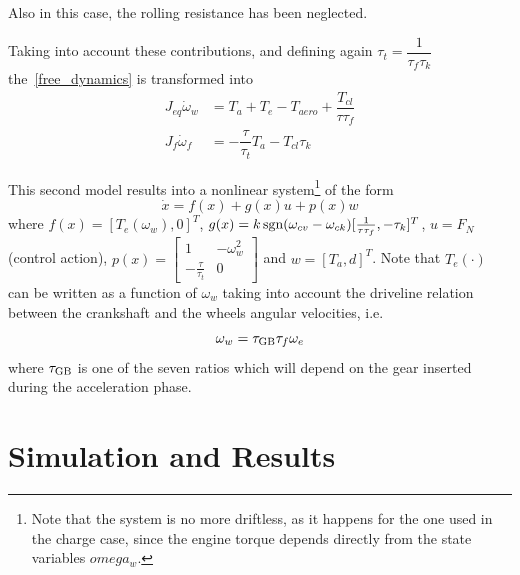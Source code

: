 \documentclass[11pt]{article}
\begin{document}
Also in this case, the rolling resistance has been neglected.

Taking into account these contributions, and defining again $\tau_{t} = \dfrac{1}{\tau_f \tau_k}$ the~\eqref{free_dynamics} is transformed into 
\begin{equation}
\begin{split}
J_{eq} \dot{\omega}_w & = T_a + T_e - T_{aero} + \dfrac{T_{cl}}{\tau \tau_f}  \\
J_f \dot{\omega}_f & = -\dfrac{\tau}{\tau_{t}} T_a - T_{cl} \tau_k
\end{split}
\label{kers_full_dynamics_discharge}
\end{equation}

This second model results into a nonlinear system\footnote{Note that the system is no more driftless, as it happens for the one used in the charge case, since the engine torque depends directly from the state variables $omega_w$.} of the form
\[
\dot{x} = f(x) + g(x)u + p(x)w 
\]
where $f(x) = [T_e(\omega_w), 0]^T$, $g(x) = k \, \textup{sgn} (\omega_{cv} - \omega_{ck}) [\frac{1}{\tau \tau_f} , -\tau_k]^T$, $u = F_N$ (control action), $p(x) =\left[  \begin{smallmatrix}
1 & -\omega_w^2 \\
-\frac{\tau}{\tau_t} & 0
\end{smallmatrix}\right] $
and $w = [T_a, d]^T$. Note that $T_e(\cdot)$ can be written as a function of $\omega_w$ taking into account the driveline relation between the crankshaft and the wheels angular velocities, i.e.
\begin{equation}
\omega_w = \tau_{\textup{GB}} \tau_f \omega_e
\label{driveline_relation}
\end{equation}
where $\tau_{\textup{GB}}$ is one of the seven ratios which will depend on the gear inserted during the acceleration phase.

\section{Simulation and Results}

\end{document}
